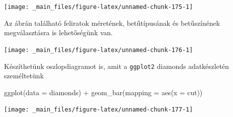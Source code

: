 \documentclass[
]{book}
\newenvironment{Shaded}{\begin{snugshade}}{\end{snugshade}}
\newcommand{\AttributeTok}[1]{\textcolor[rgb]{0.77,0.63,0.00}{#1}}
\newcommand{\DecValTok}[1]{\textcolor[rgb]{0.00,0.00,0.81}{#1}}
\newcommand{\FunctionTok}[1]{\textcolor[rgb]{0.00,0.00,0.00}{#1}}
\newcommand{\NormalTok}[1]{#1}
\newcommand{\SpecialCharTok}[1]{\textcolor[rgb]{0.00,0.00,0.00}{#1}}
\newcommand{\StringTok}[1]{\textcolor[rgb]{0.31,0.60,0.02}{#1}}
\begin{document}
\begin{center}\texttt{[image: \_main\_files/figure-latex/unnamed-chunk-175-1]} \end{center}

Az ábrán található feliratok méretének, betűtípusának és betűszínének
megválasztásra is lehetőségünk van.

\begin{Shaded}
\end{Shaded}

\begin{center}\texttt{[image: \_main\_files/figure-latex/unnamed-chunk-176-1]} \end{center}

Készíthetünk oszlopdiagramot is, amit a \texttt{ggplot2} diamonds
adatkészletén személtetünk

\begin{Shaded}
\begin{Highlighting}[]
\FunctionTok{ggplot}\NormalTok{(}\AttributeTok{data =}\NormalTok{ diamonds) }\SpecialCharTok{+}
  \FunctionTok{geom\_bar}\NormalTok{(}\AttributeTok{mapping =} \FunctionTok{aes}\NormalTok{(}\AttributeTok{x =}\NormalTok{ cut))}
\end{Highlighting}
\end{Shaded}

\begin{center}\texttt{[image: \_main\_files/figure-latex/unnamed-chunk-177-1]} \end{center}
\end{document}
